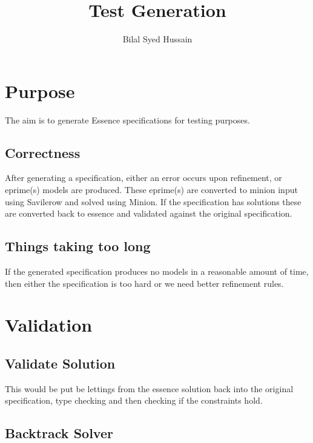 
\usepackage{enumitem}

\title{Test Generation}
\author{Bilal Syed Hussain}
\pagestyle{plain}


\maketitle

\section{Purpose}

The aim is to generate Essence specifications for testing purposes.

\subsection{Correctness}

After generating a specification, either an error occurs upon refinement, or eprime(s) models are produced.  These eprime(s) are converted to minion input using Savilerow and solved using Minion. If the specification has solutions these are converted back to essence and validated against the original specification. 

\subsection{Things taking too long}

If the generated specification produces no models  in a reasonable amount of time, then either the specification is too hard or we need better refinement rules.

\section{Validation}

\subsection{Validate Solution}

This would be put be lettings from the essence solution back into the original specification, type checking and then checking if the constraints hold.

\subsection{Backtrack Solver}

